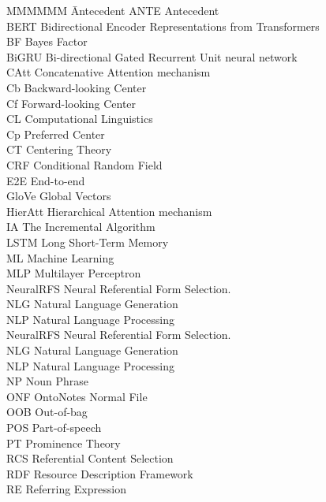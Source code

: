 
\begin{tabbing}
	MMMMMM \= Antecedent\kill
	ANTE	\> Antecedent  \\
	BERT	\> Bidirectional Encoder Representations from Transformers  \\
	BF	\> Bayes Factor  \\
	BiGRU	\> Bi-directional Gated Recurrent Unit neural network  \\
	CAtt	\> Concatenative Attention mechanism \\
	Cb \> Backward-looking Center	  \\
	Cf	\> Forward-looking Center \\
	CL	\> Computational Linguistics  \\
	Cp	\> Preferred Center \\
	CT	\> Centering Theory  \\
	CRF \> Conditional Random Field \\
	E2E \> End-to-end \\
	GloVe \> Global Vectors \\
	HierAtt \> Hierarchical Attention mechanism \\
	IA \> The Incremental Algorithm \\
	LSTM \> Long Short-Term Memory \\
	ML \> Machine Learning \\
	MLP \> Multilayer Perceptron \\
	NeuralRFS \> Neural Referential Form Selection. \\
	NLG \> Natural Language Generation \\
	NLP \> Natural Language Processing \\
	NeuralRFS \> Neural Referential Form Selection. \\
	NLG \> Natural Language Generation \\
	NLP \> Natural Language Processing \\
	NP \> Noun Phrase \\
	ONF \> OntoNotes Normal File \\
	OOB \> Out-of-bag \\
	POS \> Part-of-speech \\
	PT \> Prominence Theory\\
	RCS \> Referential Content Selection \\
	RDF \> Resource Description Framework \\
	RE \> Referring Expression \\

\end{tabbing}
